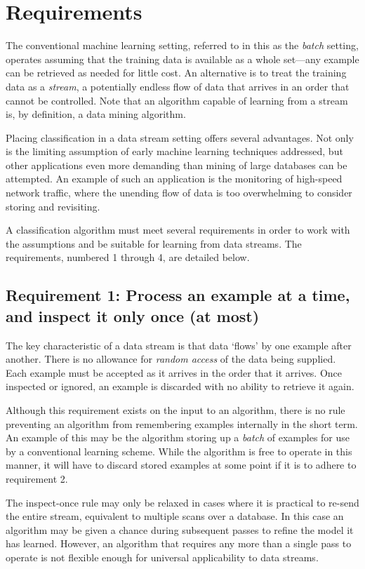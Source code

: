 \section{Requirements} 

The conventional machine learning setting, referred to in this \thesis as the {\em batch} setting, operates assuming that the training data is available as a whole set---any example can be retrieved as needed for little cost. An alternative is to treat the training data as a \emph{stream}, a potentially endless flow of data that arrives in an order that cannot be controlled.
Note that an algorithm capable of learning from a stream is, by definition, a data mining algorithm.

Placing classification in a data stream setting offers several advantages. Not only is the limiting assumption of early machine learning techniques addressed, but other applications even more demanding than mining of large databases can be attempted. An example of such an application is the monitoring of high-speed network traffic, where the unending flow of data is too overwhelming to consider storing and revisiting.

A classification algorithm must meet several requirements in order to work with the assumptions and be suitable for learning from data streams. The requirements, numbered 1 through 4, are detailed below.


\subsection*{Requirement 1: Process an example at a time, and inspect it only once (at most)}

The key characteristic of a data stream is that data `flows' by one example after another. There is no allowance for \emph{random access} of the data being supplied. Each example must be accepted as it arrives in the order that it arrives. Once inspected or ignored, an example is discarded with no ability to retrieve it again.

Although this requirement exists on the input to an algorithm, there is no rule preventing an algorithm from remembering examples internally in the short term. An example of this may be the algorithm storing up a \emph{batch} of examples for use by a conventional learning scheme. While the algorithm is free to operate in this manner, it will have to discard stored examples at some point if it is to adhere to requirement 2.

The inspect-once rule may only be relaxed in cases where it is practical to re-send the entire stream, equivalent to multiple scans over a database. In this case an algorithm may be given a chance during subsequent passes to refine the model it has learned. However, an algorithm that requires any more than a single pass to operate is not flexible enough for universal applicability to data streams.

